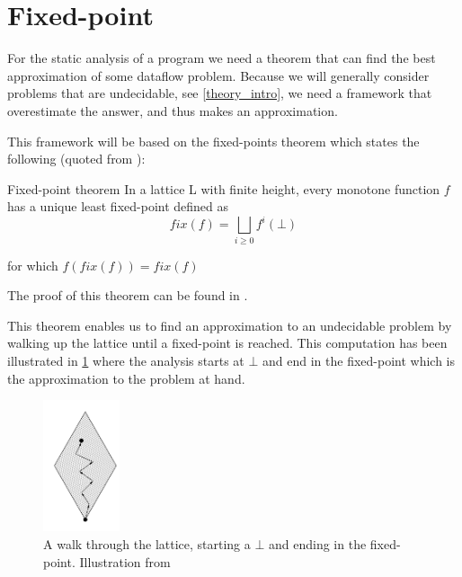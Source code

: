\section{Fixed-point}
For the static analysis of a program we need a theorem that can find the best approximation of some dataflow problem.
Because we will generally consider problems that are undecidable, see \cref{theory_intro}, we need a framework that overestimate the answer, and thus makes an approximation.

This framework will be based on the fixed-points theorem which states the following (quoted from \citet[p.~13]{schwartzbach}):

\begin{definition}{Fixed-point theorem}\label{fixed_point_definition}
In a lattice L with finite height, every monotone function $f$ has a unique least fixed-point defined as
\[ fix(f) = \bigsqcup_{i \ge 0} f^i(\bot) \]

for which $f(fix(f)) = fix(f)$
\end{definition}

\noindent
The proof of this theorem can be found in \citet[p.~13]{schwartzbach}.

This theorem enables us to find an approximation to an undecidable problem by walking up the lattice until a fixed-point is reached.
This computation has been illustrated in \cref{lattice_walk} where the analysis starts at $\bot$ and end in the fixed-point which is the approximation to the problem at hand.

\begin{figure}
\begin{center}
\includegraphics[width=0.2\textwidth]{figures/fixed-point_walk}
\end{center}
\caption{A walk through the lattice, starting a $\bot$ and ending in the fixed-point. Illustration from \citet[p.~13]{schwartzbach}}
\label{lattice_walk}
\end{figure}
